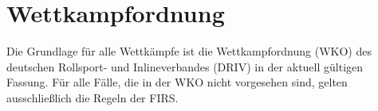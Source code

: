 \section{Wettkampfordnung}
Die Grundlage für alle Wettkämpfe ist die Wettkampfordnung (WKO) des deutschen Rollsport- und Inlineverbandes (DRIV) in der aktuell gültigen Fassung. Für alle Fälle, die in der WKO nicht vorgesehen sind, gelten ausschließlich die Regeln der FIRS.
